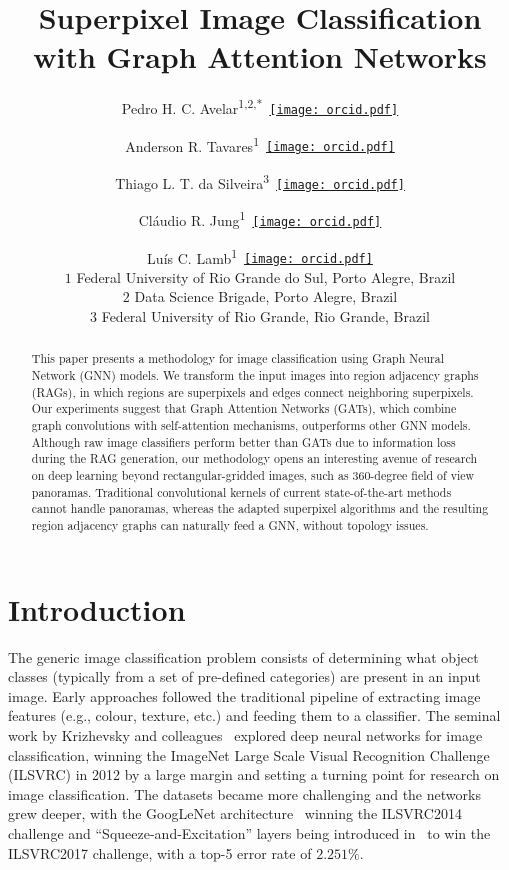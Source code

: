 \documentclass[twocolumn]{article}
\title{Superpixel Image Classification with Graph Attention Networks}
\author{
    Pedro H. C. Avelar\textsuperscript{1,2,*}~\href{https://orcid.org/0000-0002-0347-7002}{\texttt{[image: orcid.pdf]}}
    \and Anderson R. Tavares\textsuperscript{1}~\href{https://orcid.org/0000-0002-8530-6468}{\texttt{[image: orcid.pdf]}}
    \and Thiago L. T. da Silveira\textsuperscript{3}~\href{https://orcid.org/0000-0001-6788-2667}{\texttt{[image: orcid.pdf]}}
    \and Cláudio R. Jung\textsuperscript{1}~\href{https://orcid.org/0000-0002-4711-5783}{\texttt{[image: orcid.pdf]}} \quad\quad\noexpand
    \and Luís C. Lamb\textsuperscript{1}~\href{https://orcid.org/0000-0003-1571-165X}{\texttt{[image: orcid.pdf]}}\\[1em]
    $1$ Federal University of Rio Grande do Sul, Porto Alegre, Brazil\\
    $2$ Data Science Brigade, Porto Alegre, Brazil\\
    $3$ Federal University of Rio Grande, Rio Grande, Brazil
}
\date{}
\renewcommand{\thefootnote}{\fnsymbol{footnote}}
\begin{document}
\maketitle

\renewcommand*{\thefootnote}{\arabic{footnote}}
\setcounter{footnote}{0}


\begin{abstract}
This paper presents a methodology for image classification using Graph Neural Network (GNN) models. We transform the input images into region adjacency graphs (RAGs), in which regions are superpixels and edges connect neighboring superpixels. Our experiments suggest that Graph Attention Networks (GATs), which combine graph convolutions with self-attention mechanisms, outperforms other GNN models. Although raw image classifiers perform better than GATs due to information loss during the RAG generation, our methodology opens an interesting avenue of research on deep learning beyond rectangular-gridded images, such as 360-degree field of view panoramas. Traditional convolutional kernels of current state-of-the-art methods cannot handle panoramas, whereas the adapted superpixel algorithms and the resulting region adjacency graphs can naturally feed a GNN, without topology issues.
\end{abstract}

\section{Introduction}

The generic image classification problem consists of determining what object classes (typically from a set of pre-defined categories) are present in an
input image. 
Early approaches followed the traditional pipeline of extracting image features (e.g., colour, texture, etc.) and feeding them to a classifier. The seminal work by Krizhevsky and colleagues~\cite{krizhevsky2012imagenet} explored deep neural networks for image classification, winning the  ImageNet Large Scale Visual Recognition Challenge (ILSVRC) in 2012 by a large margin and setting a turning point for research on image classification. The datasets became more challenging and the networks grew deeper, with the GoogLeNet architecture~\cite{szegedy2015going} winning the ILSVRC2014 challenge and ``Squeeze-and-Excitation'' layers being introduced in~\cite{Hu_2018_CVPR} to win the ILSVRC2017 challenge, with a  top-5 error rate of $2.251\%$.
    
\end{document}
